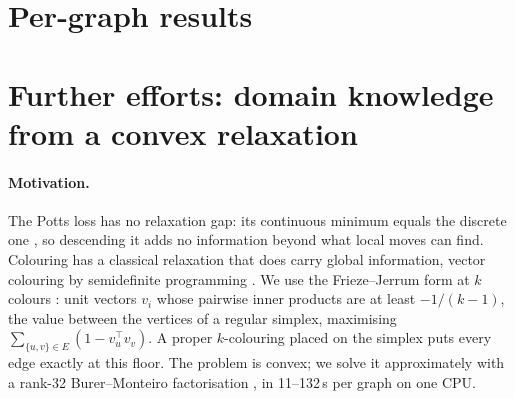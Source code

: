 \documentclass[11pt]{article}
\begin{document}
\begin{table}[h]
\centering\small

\caption{RQ3 by family, after D-CE/argmax and descent. Negative $d$ favours trained $P$ (left) or
D-CE (right).}
\label{tab:rq3fam}
\end{table}

\begin{table}[h]
\centering\small
\resizebox{\textwidth}{!}{}
\caption{D-CE applied to every RQ2 arm (after descent). Negative $d$ favours the arm's D-CE output.
The near-uniform reference is shared across arms because it depends only on the graph, $k$ and seed.
Across all nine arms, the median over graphs of the relative range
$(\max_a\bar C_a-\min_a\bar C_a)/\mathrm{mean}_a\bar C_a$ falls from 0.865 with argmax + descent to
0.685 with D-CE + descent; within graphs it shrinks on 44, ties on 16 and grows on 8 (median
$-10.2\%$).}
\label{tab:rq3arms}
\end{table}

\begin{table}[h]
\centering\small

\caption{Summed decoder and descent time (CPU, seconds) over A's 340 runs. Best-of-32 sampling is
$26\times$ the cost of argmax + descent; D-CE + descent is cheaper than argmax + descent because its
starts need less repair.}
\label{tab:rq3cost}
\end{table}

\clearpage
\section{Per-graph results}
\label{sec:pergraph}

{\footnotesize\setlength{\tabcolsep}{3.5pt}
}

\section{Further efforts: domain knowledge from a convex relaxation}
\label{sec:sdp}

\paragraph{Motivation.} The Potts loss has no relaxation gap: its continuous minimum equals the
discrete one \citep{rosenberg1972}, so descending it adds no information beyond what local moves can
find. Colouring has a classical relaxation that does carry global information, vector colouring by
semidefinite programming \citep{karger1998sdp}. We use the Frieze--Jerrum form at $k$ colours
\citep{frieze1997maxkcut}: unit vectors $v_i$ whose pairwise inner products are at least $-1/(k-1)$,
the value between the vertices of a regular simplex, maximising $\sum_{\{u,v\}\in E}(1-v_u^{\top}v_v)$.
A proper $k$-colouring placed on the simplex puts every edge exactly at this floor. The problem is
convex; we solve it approximately with a rank-32 Burer--Monteiro factorisation
\citep{burer2003nonlinear}, in 11--132\,s per graph on one CPU.
\end{document}
